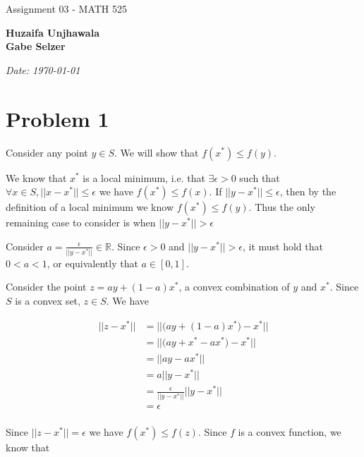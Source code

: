 \documentclass[11pt]{article}
\begin{document}
\begin{titlepage}
    \centering
    \vspace*{0.5cm}
    \par\normalfont\fontsize{35}{35}\sffamily\selectfont
    Assignment 03 - MATH 525\par 
    \vspace*{1cm}
    {\huge\bfseries Huzaifa Unjhawala \\  Gabe Selzer \par} 
    \vspace*{1cm}
    {\Large\itshape Date: \today\par} 
    \vfill
\end{titlepage}

\section*{Problem 1}

Consider any point $y\in S$. We will show that $f(x^*)\leq f(y)$.

We know that $x^*$ is a local minimum, i.e. that $\exists\epsilon>0$ such that $\forall x\in S, ||x-x^*||\leq \epsilon$ we have $f(x^*)\leq f(x)$. If $||y-x^*||\leq \epsilon$, then by the definition of a local minimum we know $f(x^*)\leq f(y)$. Thus the only remaining case to consider is when $||y-x^*||>\epsilon$

Consider $a=\frac{\epsilon}{||y-x^*||}\in\mathbb{R}$. Since $\epsilon> 0$ and $||y-x^*||>\epsilon$, it must hold that $0<a<1$, or equivalently that $a\in[0, 1]$.

Consider the point $z=ay + (1-a)x^*$, a convex combination of $y$ and $x^*$. Since $S$ is a convex set, $z\in S$. We have

\begin{equation}
\begin{split}
||z-x^*|| &= ||\bigl(ay + (1-a)x^*\bigr) - x^*|| \\
&= ||\bigl(ay + x^*-ax^*\bigr) - x^*|| \\
&= ||ay -ax^*|| \\
&= a||y -x^*|| \\
&= \frac{\epsilon}{||y-x^*||}||y -x^*|| \\
&= \epsilon\\
\end{split}
\end{equation}

Since $||z-x^*|| = \epsilon$ we have $f(x^*)\leq f(z)$. Since $f$ is a convex function, we know that
\end{document}
